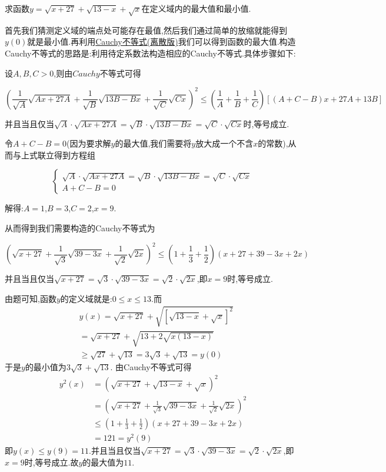 \documentclass[../../main.tex]{subfiles}%
\begin{document}
\begin{example}
求函数$y=\sqrt{x+27}+\sqrt{13-x}+\sqrt{x}$在定义域内的最大值和最小值.
\end{example}
\begin{note}
首先我们猜测定义域的端点处可能存在最值,然后我们通过简单的放缩就能得到$y(0)$就是最小值.再利用\hyperref[theorem:Cauchy不等式(离散版)]{Cauchy不等式(离散版)}我们可以得到函数的最大值.构造Cauchy不等式的思路是:利用待定系数法构造相应的Cauchy不等式.具体步骤如下:

设\(A,B,C > 0\),则由\(Cauchy\)不等式可得

\[
\left(\frac{1}{\sqrt{A}}\sqrt{Ax + 27A} + \frac{1}{\sqrt{B}}\sqrt{13B - Bx} + \frac{1}{\sqrt{C}}\sqrt{Cx}\right)^2 \leqslant \left(\frac{1}{A} + \frac{1}{B} + \frac{1}{C}\right)[(A + C - B)x + 27A + 13B]
\]

并且当且仅当\(\sqrt{A} \cdot \sqrt{Ax + 27A} = \sqrt{B} \cdot \sqrt{13B - Bx} = \sqrt{C} \cdot \sqrt{Cx}\)时,等号成立.

令\(A + C - B = 0\)(因为要求解\(y\)的最大值,我们需要将\(y\)放大成一个不含\(x\)的常数),从而与上式联立得到方程组

\[
\begin{cases}
\sqrt{A} \cdot \sqrt{Ax + 27A} = \sqrt{B} \cdot \sqrt{13B - Bx} = \sqrt{C} \cdot \sqrt{Cx}\\
A + C - B = 0
\end{cases}
\]

解得:\(A = 1\),\(B = 3\),\(C = 2\),\(x = 9\).

从而得到我们需要构造的Cauchy不等式为

\[
\left(\sqrt{x + 27} + \frac{1}{\sqrt{3}}\sqrt{39 - 3x} + \frac{1}{\sqrt{2}}\sqrt{2x}\right)^2 \leqslant \left(1 + \frac{1}{3} + \frac{1}{2}\right)(x + 27 + 39 - 3x + 2x)
\]

并且当且仅当\(\sqrt{x + 27} = \sqrt{3} \cdot \sqrt{39 - 3x} = \sqrt{2} \cdot \sqrt{2x}\),即\(x = 9\)时,等号成立. 
\end{note}
\begin{solution}

由题可知,函数\(y\)的定义域就是:\(0 \leqslant x \leqslant 13\).而
\begin{align*}
&y(x) = \sqrt{x + 27} + \sqrt{[\sqrt{13 - x} + \sqrt{x}]^2}
\\
&= \sqrt{x + 27} + \sqrt{13 + 2\sqrt{x(13 - x)}}
\\
&\geqslant \sqrt{27} + \sqrt{13} = 3\sqrt{3} + \sqrt{13} = y(0)
\end{align*}
于是\(y\)的最小值为\(3\sqrt{3} + \sqrt{13}\).
由Cauchy不等式可得
\begin{align*}
y^2(x) &= (\sqrt{x + 27} + \sqrt{13 - x} + \sqrt{x})^2\\
&= (\sqrt{x + 27} + \frac{1}{\sqrt{3}}\sqrt{39 - 3x} + \frac{1}{\sqrt{2}}\sqrt{2x})^2\\
&\leqslant (1 + \frac{1}{3} + \frac{1}{2})(x + 27 + 39 - 3x + 2x)\\
&= 121 = y^2(9)
\end{align*}
即\(y(x) \leqslant y(9) = 11\).并且当且仅当\(\sqrt{x + 27} = \sqrt{3} \cdot \sqrt{39 - 3x} = \sqrt{2} \cdot \sqrt{2x}\),即\(x = 9\)时,等号成立.故\(y\)的最大值为\(11\). 

\end{solution}
\end{document}
